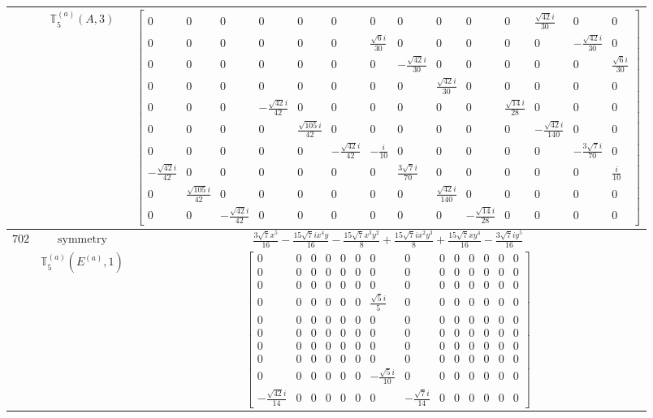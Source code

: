 \documentclass[fleqn,8pt,landscape]{jsarticle}
\begin{document}
\begin{longtable}{ccc}
$  $ & $ \mathbb{T}_{5}^{(a)}(A,3) $ & $ \begin{bmatrix} 0 & 0 & 0 & 0 & 0 & 0 & 0 & 0 & 0 & 0 & 0 & \frac{\sqrt{42} i}{30} & 0 & 0 \\ 0 & 0 & 0 & 0 & 0 & 0 & \frac{\sqrt{6} i}{30} & 0 & 0 & 0 & 0 & 0 & - \frac{\sqrt{42} i}{30} & 0 \\ 0 & 0 & 0 & 0 & 0 & 0 & 0 & - \frac{\sqrt{42} i}{30} & 0 & 0 & 0 & 0 & 0 & \frac{\sqrt{6} i}{30} \\ 0 & 0 & 0 & 0 & 0 & 0 & 0 & 0 & \frac{\sqrt{42} i}{30} & 0 & 0 & 0 & 0 & 0 \\ 0 & 0 & 0 & - \frac{\sqrt{42} i}{42} & 0 & 0 & 0 & 0 & 0 & 0 & \frac{\sqrt{14} i}{28} & 0 & 0 & 0 \\ 0 & 0 & 0 & 0 & \frac{\sqrt{105} i}{42} & 0 & 0 & 0 & 0 & 0 & 0 & - \frac{\sqrt{42} i}{140} & 0 & 0 \\ 0 & 0 & 0 & 0 & 0 & - \frac{\sqrt{42} i}{42} & - \frac{i}{10} & 0 & 0 & 0 & 0 & 0 & - \frac{3 \sqrt{7} i}{70} & 0 \\ - \frac{\sqrt{42} i}{42} & 0 & 0 & 0 & 0 & 0 & 0 & \frac{3 \sqrt{7} i}{70} & 0 & 0 & 0 & 0 & 0 & \frac{i}{10} \\ 0 & \frac{\sqrt{105} i}{42} & 0 & 0 & 0 & 0 & 0 & 0 & \frac{\sqrt{42} i}{140} & 0 & 0 & 0 & 0 & 0 \\ 0 & 0 & - \frac{\sqrt{42} i}{42} & 0 & 0 & 0 & 0 & 0 & 0 & - \frac{\sqrt{14} i}{28} & 0 & 0 & 0 & 0 \end{bmatrix} $ \\ \hline
$ 702 $ & $ \text{symmetry} $ & $ \frac{3 \sqrt{7} x^{5}}{16} - \frac{15 \sqrt{7} i x^{4} y}{16} - \frac{15 \sqrt{7} x^{3} y^{2}}{8} + \frac{15 \sqrt{7} i x^{2} y^{3}}{8} + \frac{15 \sqrt{7} x y^{4}}{16} - \frac{3 \sqrt{7} i y^{5}}{16} $ \\
$  $ & $ \mathbb{T}_{5}^{(a)}(E^{(a)},1) $ & $ \begin{bmatrix} 0 & 0 & 0 & 0 & 0 & 0 & 0 & 0 & 0 & 0 & 0 & 0 & 0 & 0 \\ 0 & 0 & 0 & 0 & 0 & 0 & 0 & 0 & 0 & 0 & 0 & 0 & 0 & 0 \\ 0 & 0 & 0 & 0 & 0 & 0 & 0 & 0 & 0 & 0 & 0 & 0 & 0 & 0 \\ 0 & 0 & 0 & 0 & 0 & 0 & \frac{\sqrt{5} i}{5} & 0 & 0 & 0 & 0 & 0 & 0 & 0 \\ 0 & 0 & 0 & 0 & 0 & 0 & 0 & 0 & 0 & 0 & 0 & 0 & 0 & 0 \\ 0 & 0 & 0 & 0 & 0 & 0 & 0 & 0 & 0 & 0 & 0 & 0 & 0 & 0 \\ 0 & 0 & 0 & 0 & 0 & 0 & 0 & 0 & 0 & 0 & 0 & 0 & 0 & 0 \\ 0 & 0 & 0 & 0 & 0 & 0 & 0 & 0 & 0 & 0 & 0 & 0 & 0 & 0 \\ 0 & 0 & 0 & 0 & 0 & 0 & - \frac{\sqrt{5} i}{10} & 0 & 0 & 0 & 0 & 0 & 0 & 0 \\ - \frac{\sqrt{42} i}{14} & 0 & 0 & 0 & 0 & 0 & 0 & - \frac{\sqrt{7} i}{14} & 0 & 0 & 0 & 0 & 0 & 0 \end{bmatrix} $ \\ \hline

\end{longtable}
\end{document}
